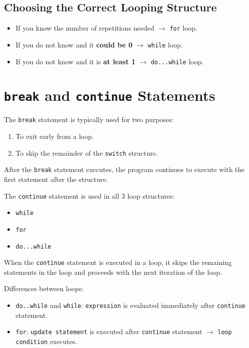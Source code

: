 \documentclass{article}
\begin{document}
\subsection{Choosing the Correct Looping Structure}
\begin{itemize}
  \item If you know the number of repetitions needed $\rightarrow$ \texttt{for} loop.
  \item If you do not know and it \textbf{could be 0} $\rightarrow$ \texttt{while} loop.
  \item If you do not know and it is \textbf{at least 1} $\rightarrow$ \texttt{do...while} loop.
\end{itemize}

\section{\texttt{break} and \texttt{continue} Statements}

\vspace{8pt}
The \texttt{break} statement is typically used for two purposes:
\begin{enumerate}
  \item To exit early from a loop.
  \item To skip the remainder of the \texttt{switch} structure.
\end{enumerate}

After the \texttt{break} statement executes, the program continues to execute
with the first statement after the structure.

\vspace{8pt}
The \texttt{continue} statement is used in all 3 loop structures:
\begin{itemize}
  \item \texttt{while}
  \item \texttt{for}
  \item \texttt{do...while}
\end{itemize}

When the \texttt{continue} statement is executed in a loop, it skips the
remaining statements in the loop and proceeds with the next iteration of the loop. 

\vspace{8pt}
Differences between loops:
\begin{itemize}
  \item \texttt{do..while} and \texttt{while}: \texttt{expression}
    is evaluated immediately after \texttt{continue} \allowbreak statement.
  \item \texttt{for}: \texttt{update statement} is executed after
    \texttt{continue} statement $\rightarrow$ \texttt{loop condition} executes.
\end{itemize}
\end{document}

